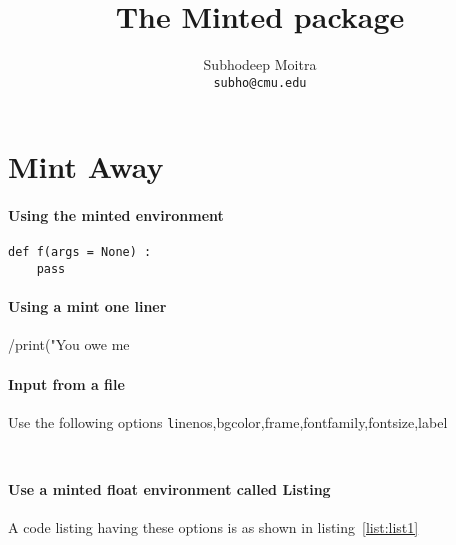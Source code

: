 \documentclass{article}
\begin{document}
\title{The Minted package}
\author{Subhodeep Moitra \\ {\tt subho@cmu.edu}}
\maketitle

\section{Mint Away}

\paragraph{Using the minted environment}

\begin{verbatim}
def f(args = None) : 
	pass
\end{verbatim}

\paragraph{Using a mint one liner}
/print("You owe me %

\paragraph{Input from a file} Use the following options {\texttt linenos,bgcolor,frame,fontfamily,fontsize,label}
\vspace{0.3in}

\inputminted[linenos=true,bgcolor=greenbg,frame=single,fontfamily=courier,fontsize=\tiny,label=Tiny Font + courier]{python}{sql.py}

\inputminted[linenos=true,bgcolor=greenbg,frame=single,fontfamily=tt,fontsize=\footnotesize,label=Foot note font + tt]{python}{sql.py}

\paragraph{Use a minted float environment called Listing} 
 A code listing having these options is as shown in listing~\ref{list:list1}

\begin{listing}[H]
\caption{Use the following options {\texttt firstline,firstnumber,lastline, numberblanklines, stepnumber, tabsize,showtabs,showspace}} 
\label{list:list1}
\inputminted[linenos=true,frame=single,firstline=9,lastline=25,showtabs=true,showspaces=true,tabsize=4,firstnumber=9,numberblanklines=false,stepnumber=2]{python}{sql.py}
\end{listing}
\end{document}
